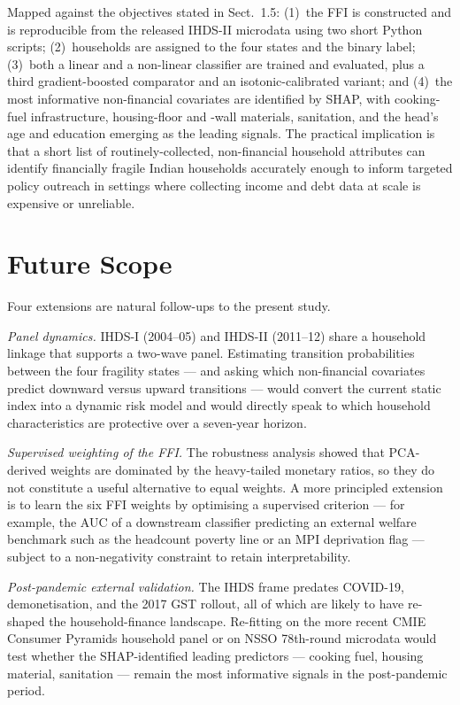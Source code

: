 \documentclass[colorlinks,balance]{asmeconf}
\begin{document}
Mapped against the objectives stated in Sect.~1.5: (1)~the FFI is constructed and is reproducible from the released IHDS-II microdata using two short Python scripts; (2)~households are assigned to the four states and the binary label; (3)~both a linear and a non-linear classifier are trained and evaluated, plus a third gradient-boosted comparator and an isotonic-calibrated variant; and (4)~the most informative non-financial covariates are identified by SHAP, with cooking-fuel infrastructure, housing-floor and -wall materials, sanitation, and the head's age and education emerging as the leading signals. The practical implication is that a short list of routinely-collected, non-financial household attributes can identify financially fragile Indian households accurately enough to inform targeted policy outreach in settings where collecting income and debt data at scale is expensive or unreliable.

\section{Future Scope}
Four extensions are natural follow-ups to the present study.

\textit{Panel dynamics.} IHDS-I (2004--05) and IHDS-II (2011--12) share a household linkage that supports a two-wave panel. Estimating transition probabilities between the four fragility states --- and asking which non-financial covariates predict downward versus upward transitions --- would convert the current static index into a dynamic risk model and would directly speak to which household characteristics are protective over a seven-year horizon.

\textit{Supervised weighting of the FFI.} The robustness analysis showed that PCA-derived weights are dominated by the heavy-tailed monetary ratios, so they do not constitute a useful alternative to equal weights. A more principled extension is to learn the six FFI weights by optimising a supervised criterion --- for example, the AUC of a downstream classifier predicting an external welfare benchmark such as the headcount poverty line or an MPI deprivation flag --- subject to a non-negativity constraint to retain interpretability.

\textit{Post-pandemic external validation.} The IHDS frame predates COVID-19, demonetisation, and the 2017 GST rollout, all of which are likely to have re-shaped the household-finance landscape. Re-fitting on the more recent CMIE Consumer Pyramids household panel or on NSSO 78th-round microdata would test whether the SHAP-identified leading predictors --- cooking fuel, housing material, sanitation --- remain the most informative signals in the post-pandemic period.
\end{document}
